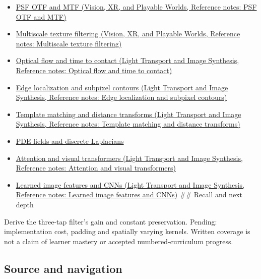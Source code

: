 \begin{itemize}
\item
  \href{../07-Vision-XR-and-Playable-Worlds/main.pdf\#nameddest=appendix-8b76b0efd27f}{PSF OTF and MTF (Vision, XR, and Playable Worlds, Reference notes: PSF OTF and MTF)}
\item
  \href{../07-Vision-XR-and-Playable-Worlds/main.pdf\#nameddest=appendix-b677a85ba76f}{Multiscale texture filtering (Vision, XR, and Playable Worlds, Reference notes: Multiscale texture filtering)}
\item
  \href{../04-Light-Transport-and-Image-Synthesis/main.pdf\#nameddest=appendix-e2e73f8cd93e}{Optical flow and time to contact (Light Transport and Image Synthesis, Reference notes: Optical flow and time to contact)}
\item
  \href{../04-Light-Transport-and-Image-Synthesis/main.pdf\#nameddest=appendix-36022286b03e}{Edge localization and subpixel contours (Light Transport and Image Synthesis, Reference notes: Edge localization and subpixel contours)}
\item
  \href{../04-Light-Transport-and-Image-Synthesis/main.pdf\#nameddest=appendix-5fb4af80d1c7}{Template matching and distance transforms (Light Transport and Image Synthesis, Reference notes: Template matching and distance transforms)}
\item
  \hyperref[appendix-1988d465c119]{PDE fields and discrete Laplacians}
\item
  \href{../04-Light-Transport-and-Image-Synthesis/main.pdf\#nameddest=appendix-a9d5dfdd164a}{Attention and visual transformers (Light Transport and Image Synthesis, Reference notes: Attention and visual transformers)}
\item
  \href{../04-Light-Transport-and-Image-Synthesis/main.pdf\#nameddest=appendix-47c51ea026fb}{Learned image features and CNNs (Light Transport and Image Synthesis, Reference notes: Learned image features and CNNs)} \#\# Recall and next depth
\end{itemize}

Derive the three-tap filter's gain and constant preservation. Pending: implementation cost, padding and spatially varying kernels. Written coverage is not a claim of learner mastery or accepted numbered-curriculum progress.

\subsection{Source and navigation}\label{appendix-d5b3c692d9f0-source-and-navigation}

